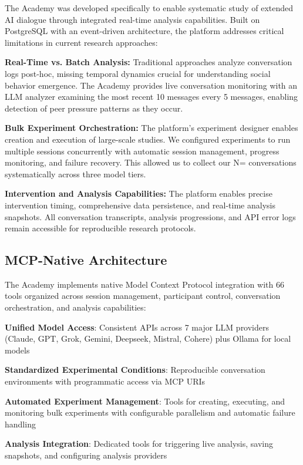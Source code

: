 \documentclass[11pt,letterpaper]{article}
\newcommand{\theacademy}{The Academy}
\newcommand{\exponedataTotalSessionsRaw}{67}
\newcommand{\exptwoTotalSessionsRaw}{61}
\newcommand{\expthreeTotalSessionsRaw}{100}
\newcommand{\totalAllPhasesRaw}{\fpeval{\exponedataTotalSessionsRaw + \exptwoTotalSessionsRaw + \expthreeTotalSessionsRaw}}
\newcommand{\totalAllPhases}{N=\totalAllPhasesRaw}
\begin{document}
\theacademy{} was developed specifically to enable systematic study of extended AI dialogue through integrated real-time analysis capabilities. Built on PostgreSQL with an event-driven architecture, the platform addresses critical limitations in current research approaches:

\textbf{Real-Time vs. Batch Analysis:} Traditional approaches analyze conversation logs post-hoc, missing temporal dynamics crucial for understanding social behavior emergence. \theacademy{} provides live conversation monitoring with an LLM analyzer examining the most recent 10 messages every 5 messages, enabling detection of peer pressure patterns as they occur.

\textbf{Bulk Experiment Orchestration:} The platform's experiment designer enables creation and execution of large-scale studies. We configured experiments to run multiple sessions concurrently with automatic session management, progress monitoring, and failure recovery. This allowed us to collect our \totalAllPhases{} conversations systematically across three model tiers.

\textbf{Intervention and Analysis Capabilities:} The platform enables precise intervention timing, comprehensive data persistence, and real-time analysis snapshots. All conversation transcripts, analysis progressions, and API error logs remain accessible for reproducible research protocols.

\subsection{MCP-Native Architecture}

\theacademy{} implements native Model Context Protocol integration with 66 tools organized across session management, participant control, conversation orchestration, and analysis capabilities:

\textbf{Unified Model Access}: Consistent APIs across 7 major LLM providers (Claude, GPT, Grok, Gemini, Deepseek, Mistral, Cohere) plus Ollama for local models

\textbf{Standardized Experimental Conditions}: Reproducible conversation environments with programmatic access via MCP URIs

\textbf{Automated Experiment Management}: Tools for creating, executing, and monitoring bulk experiments with configurable parallelism and automatic failure handling

\textbf{Analysis Integration}: Dedicated tools for triggering live analysis, saving snapshots, and configuring analysis providers
\end{document}

